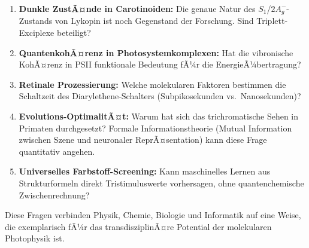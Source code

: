 ﻿\documentclass[a4paper,12pt]{article}
\theoremstyle{definition}
\begin{document}
\begin{enumerate}
  \item \textbf{Dunkle ZustÃ¤nde in Carotinoiden:} Die genaue Natur des $S_1$/$2A_g^-$-Zustands
        von Lykopin ist noch Gegenstand der Forschung. Sind Triplett-Exciplexe beteiligt?
  \item \textbf{QuantenkohÃ¤renz in Photosystemkomplexen:} Hat die vibronische KohÃ¤renz
        in PSII funktionale Bedeutung fÃ¼r die EnergieÃ¼bertragung?
  \item \textbf{Retinale Prozessierung:} Welche molekularen Faktoren bestimmen die
        Schaltzeit des Diarylethene-Schalters (Subpikosekunden vs.\ Nanosekunden)?
  \item \textbf{Evolutions-OptimalitÃ¤t:} Warum hat sich das trichromatische Sehen in
        Primaten durchgesetzt? Formale Informationstheorie (Mutual Information zwischen
        Szene und neuronaler ReprÃ¤sentation) kann diese Frage quantitativ angehen.
  \item \textbf{Universelles Farbstoff-Screening:} Kann maschinelles Lernen aus
        Strukturformeln direkt Tristimuluswerte vorhersagen, ohne quantenchemische
        Zwischenrechnung?
\end{enumerate}

Diese Fragen verbinden Physik, Chemie, Biologie und Informatik auf eine Weise,
die exemplarisch fÃ¼r das transdisziplinÃ¤re Potential der molekularen Photophysik ist.
\end{document}
